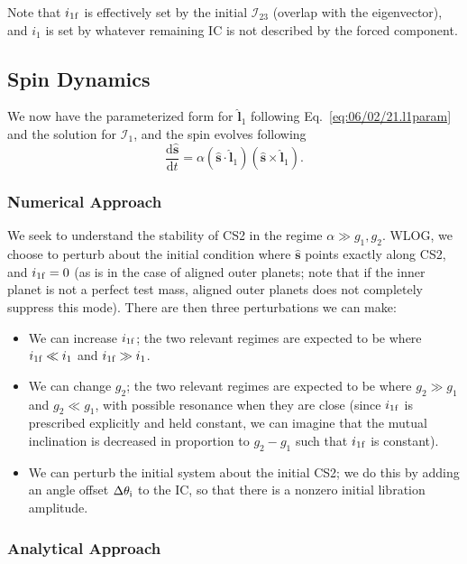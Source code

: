\documentclass[11pt,
        usenames, %
        dvipsnames %
    ]{article}
\newcommand*{\rd}[2]{\frac{\mathrm{d}#1}{\mathrm{d}#2}}
\newcommand*{\bm}[1]{\boldsymbol{\mathbf{#1}}}
\newcommand*{\uv}[1]{\hat{\bm{#1}}}
\newcommand*{\p}[1]{\left(#1\right)}
\begin{document}
Note that $i_{\rm 1f}$ is effectively set by the initial $\mathcal{I}_{23}$
(overlap with the eigenvector), and $i_{1}$ is set by whatever remaining IC is
not described by the forced component.

\subsection{Spin Dynamics}

We now have the parameterized form for $\uv{l}_1$ following
Eq.~\eqref{eq:06/02/21.l1param} and the solution for $\mathcal{I}_1$, and the
spin evolves following
\begin{equation}
    \rd{\uv{s}}{t} = \alpha\p{\uv{s} \cdot \uv{l}_1}\p{\uv{s} \times \uv{l}_1}.
\end{equation}

\subsubsection{Numerical Approach}

We seek to understand the stability of CS2 in the regime $\alpha \gg g_1, g_2$.
WLOG, we choose to perturb about the initial condition where $\uv{s}$ points
exactly along CS2, and $i_{\rm 1f} = 0$ (as is in the case of aligned outer
planets; note that if the inner planet is not a perfect test mass, aligned outer
planets does not completely suppress this mode). There are then three
perturbations we can make:
\begin{itemize}
    \item We can increase $i_{\rm 1f}$; the two relevant regimes are expected to
        be where $i_{\rm 1f} \ll i_1$ and $i_{\rm 1f} \gg i_1$.

    \item We can change $g_2$; the two relevant regimes are expected to be where
        $g_2 \gg g_1$ and $g_2 \ll g_1$, with possible resonance when they are
        close (since $i_{\rm 1f}$ is prescribed explicitly and held constant, we
        can imagine that the mutual inclination is decreased in proportion to
        $g_{2} - g_1$ such that $i_{\rm 1f}$ is constant).

    \item We can perturb the initial system about the initial CS2; we do this by
        adding an angle offset $\Delta \theta_{\rm i}$ to the IC, so that there
        is a nonzero initial libration amplitude.
\end{itemize}

\subsubsection{Analytical Approach}
\end{document}
